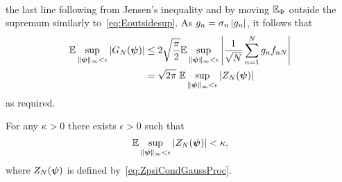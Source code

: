 \documentclass[journal]{IEEEtran}
\begin{document}
\begin{IEEEproof}
\begin{align*}
\end{align*}
the last line following from Jensen's inequality and by moving ${\mathbb E}_{\Phi}$ outside the supremum similarly to~\eqref{eq:Eoutsidesup}. As $g_n = \sigma_n \left\vert g_n \right\vert$, it follows that
\begin{align*}
{\mathbb E} \sup_{\|\boldsymbol{\psi}\|_{\infty} < \epsilon} \left\vert G_N(\boldsymbol{\psi}) \right\vert  &\leq 2\sqrt{\frac{\pi}{2}} {\mathbb E} \sup_{\|\boldsymbol{\psi}\|_{\infty} < \epsilon}  \left\vert  \frac{1}{\sqrt{N}}\sum_{n=1}^{N} g_n  f_{nN} \right\vert \\
&= \sqrt{2\pi} \; {\mathbb E} \sup_{\|\boldsymbol{\psi}\|_{\infty} < \epsilon}  \left\vert  Z_N(\boldsymbol{\psi})  \right\vert 
\end{align*}
as required.
\end{IEEEproof}
 
\begin{lemma} \label{lem:chaining}
For any $\kappa > 0$ there exists $\epsilon > 0$ such that
\[
{\mathbb E} \sup_{\|\boldsymbol{\psi}\|_{\infty} < \epsilon} \left\vert  Z_N(\boldsymbol{\psi})  \right\vert < \kappa,
\]
where $Z_N(\boldsymbol{\psi})$ is defined by~\eqref{eq:ZpsiCondGaussProc}.
\end{lemma}
\end{document}
